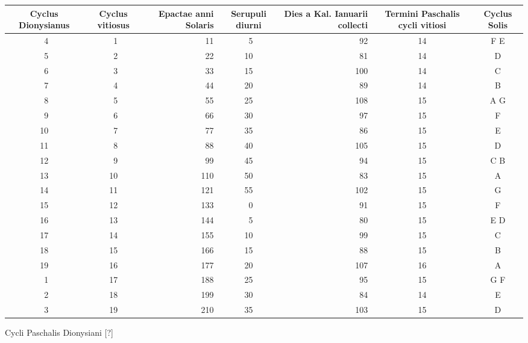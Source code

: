 %
\begin{tabnums} %
\normalsize
\centering
\renewcommand{\arraystretch}{1.017} %
\newcommand{\hts}{\scriptsize}
\newcommand{\cwd}{4em}
%
\newcommand{\da}{\scriptsize{†}}
\begin{tabular}{@{} c c r c r c c @{}}
\toprule
  \hts{\parbox[b]{\cwd}{\raggedright Cy\-clus Dio\-ny\-si\-an\-us}} &
  \hts{\parbox[b]{\cwd}{\raggedright Cy\-clus vi\-ti\-o\-sus}} &
  \hts{\parbox[b]{\cwd}{\raggedright E\-pac\-tae an\-ni So\-la\-ris}} &
  \hts{\parbox[b]{\cwd}{\raggedright Seru\-pu\-li di\-ur\-ni}} &
  \hts{\parbox[b]{\cwd}
    {\raggedright Di\-es a Kal. Ia\-nu\-a\-rii col\-lec\-ti}} &
  \hts{\parbox[b]{\cwd}
    {\raggedright Ter\-mi\-ni Pas\-cha\-lis cy\-cli vi\-ti\-o\-si}} &
  \hts{\parbox[b]{\cwd}{\raggedright Cy\-clus So\-lis}}
\\
\midrule
 ~4 & ~1 &  11 & ~5 &  92 & 14 & F E \\
 ~5 & ~2 &  22 & 10 &  81 & 14 &  D  \\
 ~6 & ~3 &  33 & 15 & 100 & 14 &  C  \\
 ~7 & ~4 &  44 & 20 &  89 & 14 &  B  \\
 ~8 & ~5 &  55 & 25 & 108 & 15 & A G \\
 ~9 & ~6 &  66 & 30 &  97 & 15 &  F  \\
 10 & ~7 &  77 & 35 &  86 & 15 &  E  \\
 11 & ~8 &  88 & 40 & 105 & 15 &  D  \\
 12 & ~9 &  99 & 45 &  94 & 15 & C B \\
 13 & 10 & 110 & 50 &  83 & 15 &  A  \\
 14 & 11 & 121 & 55 & 102 & 15 &  G  \\
 15 & 12 & 133 & ~0 &  91 & 15 &  F  \\
 16 & 13 & 144 & ~5 &  80 & 15 & E D \\
 17 & 14 & 155 & 10 &  99 & 15 &  C  \\
 18 & 15 & 166 & 15 &  88 & 15 &  B  \\
 19 & 16 & 177 & 20 & 107 & 16 &  A  \\
 ~1 & 17 & 188 & 25 &  95 & 15 & G F  \\
 ~2 & 18 & 199 & 30 &  84 & 14 &  E  \\
 ~3 & 19 & 210 & 35 & 103 & 15 &  D  \\
\bottomrule
\end{tabular}
%
\caption{Cycli Paschalis Dionysiani [?]}
\label{tab:p164}
%
\end{tabnums}
